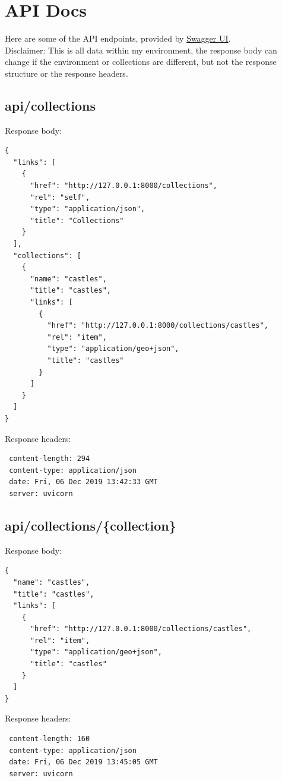 \chapter{API Docs}
Here are some of the API endpoints, provided by \href{https://swagger.io/}{Swagger UI}.\\
Disclaimer: This is all data within my environment, the response body can change if the environment or collections are different, but not the response structure or the response headers.
\section{api/collections}
Response body:
\begin{verbatim}
{
  "links": [
    {
      "href": "http://127.0.0.1:8000/collections",
      "rel": "self",
      "type": "application/json",
      "title": "Collections"
    }
  ],
  "collections": [
    {
      "name": "castles",
      "title": "castles",
      "links": [
        {
          "href": "http://127.0.0.1:8000/collections/castles",
          "rel": "item",
          "type": "application/geo+json",
          "title": "castles"
        }
      ]
    }
  ]
}
\end{verbatim}
Response headers:
\begin{verbatim}
 content-length: 294 
 content-type: application/json 
 date: Fri, 06 Dec 2019 13:42:33 GMT 
 server: uvicorn 
\end{verbatim}
\section{api/collections/\{collection\}}
Response body:
\begin{verbatim}
{
  "name": "castles",
  "title": "castles",
  "links": [
    {
      "href": "http://127.0.0.1:8000/collections/castles",
      "rel": "item",
      "type": "application/geo+json",
      "title": "castles"
    }
  ]
}
\end{verbatim}
Response headers:
\begin{verbatim}
 content-length: 160 
 content-type: application/json 
 date: Fri, 06 Dec 2019 13:45:05 GMT 
 server: uvicorn 
\end{verbatim}
\newpage
